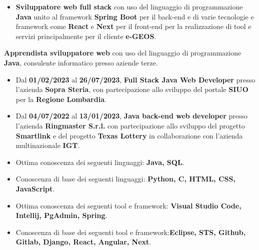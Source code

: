 \documentclass[10pt,a4paper]{altacv}
\begin{document}
\begin{itemize}
    \item \textbf{Sviluppatore web full stack} con uso del linguaggio di programmazione \textbf{Java} unito al framework \textbf{Spring Boot}
    per il back-end e di varie tecnologie e framework come \textbf{React} e \textbf{Next} per il front-end per la realizzazione di tool e servizi
    principalmente per il cliente \textbf{e-GEOS}.
\end{itemize}
\textbf{Apprendista sviluppatore web} con uso del linguaggio di programmazione \textbf{Java}, consulente informatico presso
  aziende terze.
\begin{itemize}
  \item Dal \textbf{01/02/2023} al \textbf{26/07/2023}, \textbf{Full Stack Java Web Developer} presso l'azienda \textbf{Sopra Steria}, con partecipazione allo sviluppo del portale \textbf{SIUO} per la \textbf{Regione Lombardia}.
  \item Dal \textbf{04/07/2022} al \textbf{13/01/2023}, \textbf{Java back-end web developer} presso l'azienda \textbf{Ringmaster S.r.l.} con partecipazione allo
  sviluppo del progetto \textbf{Smartlink} e del progetto \textbf{Texas Lottery} in collaborazione con l'azienda multinazionale \textbf{IGT}.
\end{itemize}

\begin{itemize}
    \item Ottima conoscenza dei seguenti linguaggi: \textbf{Java, SQL}.
    \item Conoscenza di base dei seguenti linguaggi: \textbf{Python, C, HTML, CSS, JavaScript}.
    \item Ottima conoscenza dei seguenti tool e framework: \textbf{Visual Studio Code, Intellij, PgAdmin, Spring}.
    \item Conoscenza di base dei seguenti tool e framework:\textbf{Eclipse, STS, Github, Gitlab, Django, React, Angular, Next}.
\end{itemize}



\end{document}
